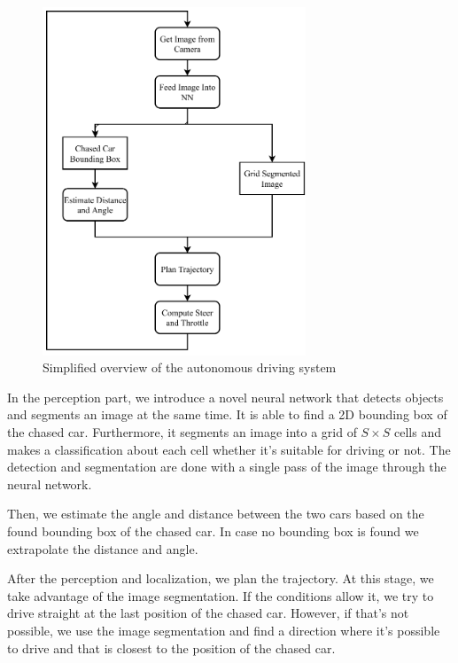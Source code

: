 \begin{figure}[h!]
    \centering
    \includegraphics[width=0.7\textwidth]{images/bachelor_diagram4.pdf}
    \caption{Simplified overview of the autonomous driving system}\label{f:overview}
\end{figure}


In the perception part, we introduce a novel neural network that detects objects and segments an image at the same time. It is able to find a 2D bounding box of the chased car. Furthermore, it segments an image into a grid of $S\times S$ cells and makes a classification about each cell whether it's suitable for driving or not. The detection and segmentation are done with a single pass of the image through the neural network. \par


Then, we estimate the angle and distance between the two cars based on the found bounding box of the chased car. In case no bounding box is found we extrapolate the distance and angle. \par


After the perception and localization, we plan the trajectory. At this stage, we take advantage of the image segmentation. If the conditions allow it, we try to drive straight at the last position of the chased car. However, if that's not possible, we use the image segmentation and find a direction where it's possible to drive and that is closest to the position of the chased car. \par


